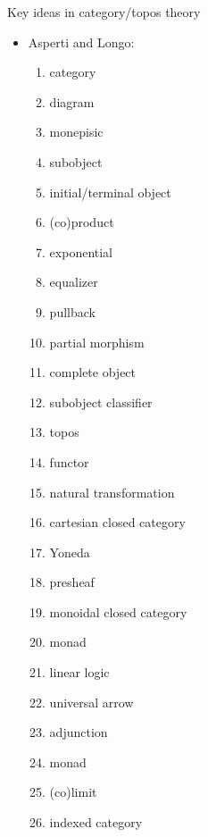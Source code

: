 \begin{plSection}{Key ideas in category/topos theory}
\begin{itemize}
\item Asperti and Longo:~\cite{AspertiLongo:1991}
\begin{enumerate}
  \item category
  \item diagram
  \item monepisic
  \item subobject
  \item initial/terminal object
  \item (co)product
  \item exponential
  \item equalizer
  \item pullback
  \item partial morphism
  \item complete object
  \item subobject classifier
  \item topos
  \item functor
  \item natural transformation
  \item cartesian closed category
  \item Yoneda
  \item presheaf
  \item monoidal closed category
  \item monad
  \item linear logic
  \item universal arrow
  \item adjunction
  \item monad
  \item (co)limit
  \item indexed category
\end{enumerate}


\end{itemize}
\end{plSection}

